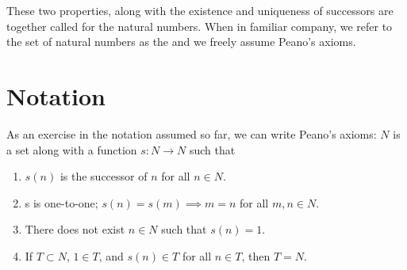 These two properties, along with the existence and uniqueness of successors are together called  for the natural numbers.
When in familiar company, we refer to the set of natural numbers as the  and we freely assume Peano's axioms.

\section{Notation}

As an exercise in the notation assumed so far, we can write Peano's axioms: $N$ is a set along with a function $s: N \to N$ such that
\begin{enumerate}
  \item $s(n)$ is the successor of $n$ for all $n \in N$.
  \item s is one-to-one; $s(n) = s(m) \implies m = n$  for all $m, n \in N$.
  \item There does not exist $n \in N$ such that $s(n) = 1$.
  \item If $T \subset N$, $1 \in T$, and $s(n) \in T$ for all $n \in T$, then $T = N$.
\end{enumerate}


